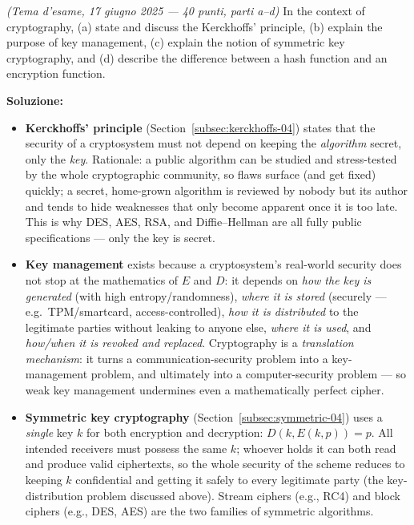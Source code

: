 \documentclass[12pt, a4paper]{article}
\newcounter{esercizio}[section]
\begin{document}
\begin{tcolorbox}[colback=lightergray!10, colframe=tocsec, title=\textbf{Esercizio \theesercizio}]
\textit{(Tema d'esame, 17 giugno 2025 --- 40 punti, parti a--d)} In the context of cryptography, (a) state and discuss the Kerckhoffs' principle, (b) explain the purpose of key management, (c) explain the notion of symmetric key cryptography, and (d) describe the difference between a hash function and an encryption function.
\end{tcolorbox}

\textbf{Soluzione:}
\begin{itemize}
    \item[(a)] \textbf{Kerckhoffs' principle} (Section~\ref{subsec:kerckhoffs-04}) states that the security of a cryptosystem must not depend on keeping the \emph{algorithm} secret, only the \emph{key}. Rationale: a public algorithm can be studied and stress-tested by the whole cryptographic community, so flaws surface (and get fixed) quickly; a secret, home-grown algorithm is reviewed by nobody but its author and tends to hide weaknesses that only become apparent once it is too late. This is why DES, AES, RSA, and Diffie--Hellman are all fully public specifications --- only the key is secret.
    \item[(b)] \textbf{Key management} exists because a cryptosystem's real-world security does not stop at the mathematics of $E$ and $D$: it depends on \emph{how the key is generated} (with high entropy/randomness), \emph{where it is stored} (securely --- e.g.\ TPM/smartcard, access-controlled), \emph{how it is distributed} to the legitimate parties without leaking to anyone else, \emph{where it is used}, and \emph{how/when it is revoked and replaced}. Cryptography is a \emph{translation mechanism}: it turns a communication-security problem into a key-management problem, and ultimately into a computer-security problem --- so weak key management undermines even a mathematically perfect cipher.
    \item[(c)] \textbf{Symmetric key cryptography} (Section~\ref{subsec:symmetric-04}) uses a \emph{single} key $k$ for both encryption and decryption: $D(k, E(k,p)) = p$. All intended receivers must possess the same $k$; whoever holds it can both read and produce valid ciphertexts, so the whole security of the scheme reduces to keeping $k$ confidential and getting it safely to every legitimate party (the key-distribution problem discussed above). Stream ciphers (e.g., RC4) and block ciphers (e.g., DES, AES) are the two families of symmetric algorithms.

\end{itemize}
\end{document}
